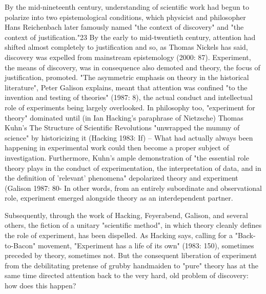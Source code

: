 By the mid-nineteenth century, understanding of scientific work had begun to polarize into two epistemological conditions, which physicist and philosopher Hans Reichenbach later famously named "the context of discovery" and "the context of justification."23 By the early to mid-twentieth century, attention had shifted almost completely to justification and so, as Thomas Nickels has said, discovery was expelled from mainstream epistemology (2000: 87). Experiment, the means of discovery, was in consequence also demoted and theory, the focus of justification, promoted. "The asymmetric emphasis on theory in the historical literature", Peter Galison explains, meant that attention was confined "to the invention and testing of theories" (1987: 8), the actual conduct and intellectual role of experiments being largely overlooked. In philosophy too, "experiment for theory" dominated until (in Ian Hacking's paraphrase of Nietzsche) Thomas Kuhn's The Structure of Scientific Revolutions "unwrapped the mummy of science" by historicizing it (Hacking 1983: If) – What had actually always been happening in experimental work could then become a proper subject of investigation. Furthermore, Kuhn's ample demonstration of "the essential role theory plays in the conduct of experimentation, the interpretation of data, and in the definition of 'relevant' phenomena" depolarized theory and experiment (Galison 1987: 80- In other words, from an entirely subordinate and observational role, experiment emerged alongside theory as an interdependent partner.

Subsequently, through the work of Hacking, Feyerabend, Galison, and several others, the fiction of a unitary "scientific method", in which theory cleanly defines the role of experiment, has been dispelled. As Hacking says, calling for a "Back-to-Bacon" movement, "Experiment has a life of its own" (1983: 150), sometimes preceded by theory, sometimes not. But the consequent liberation of experiment from the debilitating pretense of grubby handmaiden to "pure" theory has at the same time directed attention back to the very hard, old problem of discovery: how does this happen?

